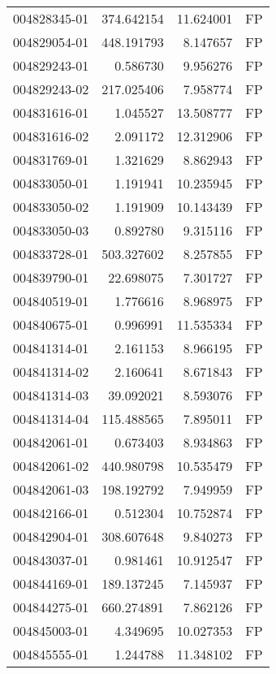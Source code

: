 \begin{tabular}{lrrl}
004828345-01 &  374.642154 &      11.624001 &   FP \\
004829054-01 &  448.191793 &       8.147657 &   FP \\
004829243-01 &    0.586730 &       9.956276 &   FP \\
004829243-02 &  217.025406 &       7.958774 &   FP \\
004831616-01 &    1.045527 &      13.508777 &   FP \\
004831616-02 &    2.091172 &      12.312906 &   FP \\
004831769-01 &    1.321629 &       8.862943 &   FP \\
004833050-01 &    1.191941 &      10.235945 &   FP \\
004833050-02 &    1.191909 &      10.143439 &   FP \\
004833050-03 &    0.892780 &       9.315116 &   FP \\
004833728-01 &  503.327602 &       8.257855 &   FP \\
004839790-01 &   22.698075 &       7.301727 &   FP \\
004840519-01 &    1.776616 &       8.968975 &   FP \\
004840675-01 &    0.996991 &      11.535334 &   FP \\
004841314-01 &    2.161153 &       8.966195 &   FP \\
004841314-02 &    2.160641 &       8.671843 &   FP \\
004841314-03 &   39.092021 &       8.593076 &   FP \\
004841314-04 &  115.488565 &       7.895011 &   FP \\
004842061-01 &    0.673403 &       8.934863 &   FP \\
004842061-02 &  440.980798 &      10.535479 &   FP \\
004842061-03 &  198.192792 &       7.949959 &   FP \\
004842166-01 &    0.512304 &      10.752874 &   FP \\
004842904-01 &  308.607648 &       9.840273 &   FP \\
004843037-01 &    0.981461 &      10.912547 &   FP \\
004844169-01 &  189.137245 &       7.145937 &   FP \\
004844275-01 &  660.274891 &       7.862126 &   FP \\
004845003-01 &    4.349695 &      10.027353 &   FP \\
004845555-01 &    1.244788 &      11.348102 &   FP \\

\end{tabular}
